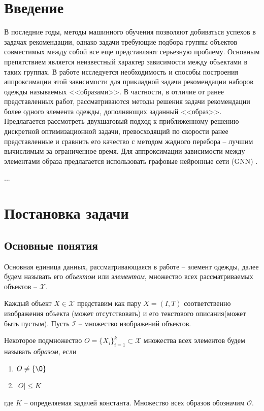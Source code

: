 \documentclass[a4paper,12pt]{article}
\begin{document}
	\section{Введение}
		В последние годы, методы машинного обучения позволяют добиваться успехов в задачах рекомендации, однако задачи требующие подбора группы объектов совместимых между собой все еще представляют серьезную проблему. Основным препятствием является неизвестный характер зависимости между объектами в таких группах. В работе исследуется необходимость и способы построения аппроксимации этой зависимости для прикладной задачи рекомендации наборов одежды называемых <<образами>>.
		В частности, в отличие от ранее представленных работ, рассматриваются методы решения задачи рекомендации более одного элемента одежды, дополняющих заданный <<образ>>. Предлагается рассмотреть двухшаговый подход к приближенному решению дискретной оптимизационной задачи,  превосходящий по скорости ранее представленные и сравнить его качество с методом жадного перебора -- лучшим вычислимым за ограниченное время. Для аппроксимации зависимости между элементами образа предлагается использовать графовые нейронные сети (GNN) \cite{scarselli2008graph}.
		
		...
		
			
	\section{Постановка задачи}
		\subsection{Основные понятия}
			Основная единица данных, рассматривающаяся в работе -- элемент одежды, далее будем называть его \textit{объектом} или \textit{элементом}, множество всех рассматриваемых объектов -- $\mathcal{X}$. 
			
			Каждый объект $X\in\mathcal{X}$ представим как пару $X = (I, T)$ соответственно изображения объекта (может отсутствовать) и его текстового описания(может быть пустым). Пусть $\mathcal{I}$ -- множество изображений объектов.
			
			Некоторое подмножество $O = \{X_i\}_{i=1}^k\subset \mathcal{X}$ множества всех элементов будем называть \textit{образом}, если
			\begin{enumerate}
				\item $O\neq\{\O\}$
				\item $|O| \leqslant K$
			\end{enumerate}
		    где $K$ -- определяемая задачей константа. 
			Множество всех образов обозначим $\mathcal{O}$.
		    
\end{document}
